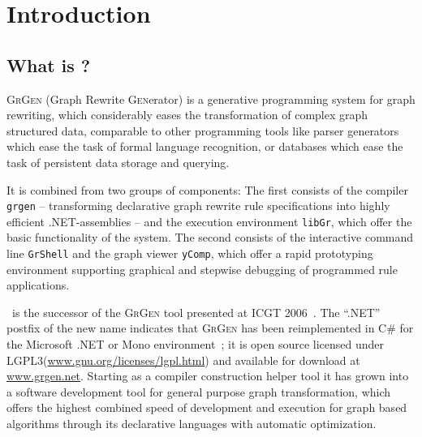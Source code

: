 \chapter{Introduction}
\label{chp:intro}


\section{What is \GrG?}

{\scshape GrGen} (\textsc{G}raph \textsc{R}ewrite \textsc{Gen}erator) is a generative programming system for graph rewriting,
which considerably eases the transformation of complex graph structured data,
comparable to other programming tools like parser generators which ease the task of formal language recognition,
or databases which ease the task of persistent data storage and querying. 

It is combined from two groups of components:
The first consists of the compiler \texttt{grgen} -- transforming declarative graph rewrite rule specifications into highly efficient .NET-assemblies --
and the execution environment \texttt{libGr}, which offer the basic functionality of the system. 
The second consists of the interactive command line \texttt{GrShell} and the graph viewer \texttt{yComp},
which offer a rapid prototyping environment supporting graphical and stepwise debugging of programmed rule applications.

\GrG~is the successor of the \textsc{GrGen} tool presented at ICGT 2006~\cite{GBGHS:06}. 
The ``.NET'' postfix of the new name indicates that \textsc{GrGen} has been reimplemented in C\# for the Microsoft .NET or Mono environment~\cite{NET,MONO};
it is open source licensed under LGPL3(\url{www.gnu.org/licenses/lgpl.html}) and available for download at \url{www.grgen.net}.
Starting as a compiler construction helper tool it has grown into a software development tool for general purpose graph transformation,
which offers the highest combined speed of development and execution for graph based algorithms through its declarative languages with automatic optimization.


